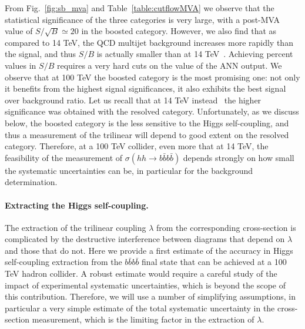 \documentclass[a4paper,10pt]{article}
\begin{document}
From Fig.~\ref{fig:sb_mva} and Table~\ref{table:cutflowMVA} we observe that the statistical
significance of the three categories is very large, with a post-MVA value of
$S/\sqrt{B}\simeq 20$ in the boosted
category.
%
However, we also find that as compared to 14 TeV, the QCD multijet background increases
more rapidly than the signal, and thus $S/B$ is actually smaller than at 14 TeV~\cite{Behr:2015oqq}.
%
Achieving  percent values in $S/B$ requires a very hard cuts on the value of the ANN output.
%
We observe that at 100 TeV the boosted category is the most promising one: not only
it benefits from the highest signal significances, it also exhibits
the best signal over background ratio.
%
Let us recall that at 14 TeV instead~\cite{Behr:2015oqq}  the higher significance was obtained with the resolved category.
%
Unfortunately, as we discuss below, the boosted category is the less sensitive to the Higgs self-coupling,
and thus a measurement of the trilinear will depend to good extent on the resolved category.
%
Therefore, at a 100 TeV collider, even more that at 14 TeV, the feasibility of the measurement
of $\sigma(hh\to b\bar{b}b\bar{b})$ depends strongly on how small the systematic
uncertainties can be, in particular for the background determination.

\paragraph{Extracting the Higgs self-coupling.}
%
The extraction of the trilinear coupling $\lambda$ from the
  corresponding cross-section is complicated by the
  destructive interference
  between diagrams that depend on $\lambda$ and those that do not.
 Here we provide a first estimate of the accuracy
  in Higgs self-coupling extraction from the $b\bar{b}b\bar{b}$ final state
  that can be achieved at a 100 TeV hadron collider.
  A robust estimate  would require
  a careful study of the impact of
  experimental systematic uncertainties, which is beyond the scope of this contribution.
  Therefore, we will use a number of simplifying assumptions, in particular
  a very simple estimate of the total systematic uncertainty in the cross-section
  measurement, which is the limiting factor in the extraction of $\lambda$.
\end{document}
